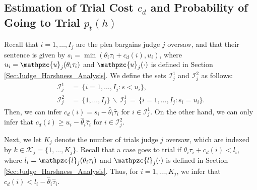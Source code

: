 \documentclass[11pt, oneside]{article}   	%
\theoremstyle{ModifiedStyle}
\begin{document}
	\subsection{Estimation of Trial Cost $c_d$ and Probability of Going to Trial $p_t(h)$}
		Recall that $i=1,\ldots,I_j$ are the plea bargains judge $j$ oversaw, and that their sentence is given by $s_i=\min(\theta_i\tau_i+c_d(i),u_i)$, where $u_i = \mathpzc{u}_j(\theta_i\tau_i)$ and $\mathpzc{u}_j(\cdot)$ is defined in Section \ref{Sec:Judge_Harshness_Analysis}. We define the sets $\mathcal{I}_j^1$ and $\mathcal{I}_j^2$ as follows:
			\begin{align*}
				\mathcal{I}_j^1 &\,=\, \{i=1,\ldots,I_j: s < u_i\}, \\
				\mathcal{I}_j^2 &\,=\, \{1,\ldots,I_j\} \,\backslash\, \mathcal{I}_j^1 \,=\, \{i=1,\ldots,I_j:s_i=u_i\}.
			\end{align*}
			Then, we can infer $c_d(i) = s_i - \hat{\theta}_i\hat{\tau}_i$ for $i\in\mathcal{I}_j^1$. On the other hand, we can only infer that $c_d(i) \geq u_i - \hat{\theta}_i\hat{\tau}_i$ for $i\in\mathcal{I}^2_j$.

		Next, we let $K_j$ denote the number of trials judge $j$ oversaw, which are indexed by $k \in \mathcal{K}_j = \{1,\ldots,K_j\}$. Recall that a case goes to trial if $\theta_i\tau_i+c_d(i)<l_i$, where $l_i=\mathpzc{l}_j(\theta_i\tau_i)$ and $\mathpzc{l}_j(\cdot)$ is defined in Section \ref{Sec:Judge_Harshness_Analysis}. Thus, for $i=1,\ldots,K_j$, we infer that $c_d(i) < l_i-\hat{\theta}_i\hat{\tau}_i$.
\end{document}
